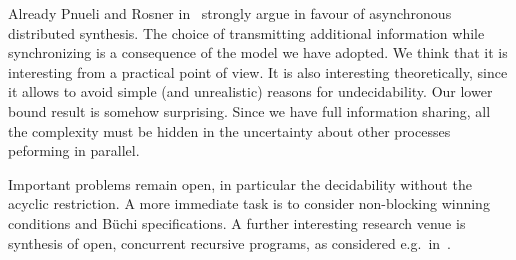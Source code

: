 \documentclass{llncs}
\begin{document}
Already Pnueli and Rosner in~\cite{PR89icalp} strongly argue in
favour of asynchronous distributed synthesis.  
The choice of transmitting additional information while synchronizing
is a consequence of the model we have adopted. We think that it is
interesting from a practical point of view. It is also interesting
theoretically, since it allows to avoid simple (and unrealistic)
reasons for undecidability. Our lower bound result is somehow
surprising. Since we have full information sharing, all the
complexity must be hidden in the uncertainty about other processes
peforming in parallel. 

Important problems remain open, in particular the decidability 
without the acyclic restriction. A more immediate task is to consider
non-blocking winning conditions and B\"uchi specifications. A further
interesting research venue is synthesis of open,
concurrent recursive programs, as considered e.g.~in~\cite{bgh09}.






 
\end{document}
